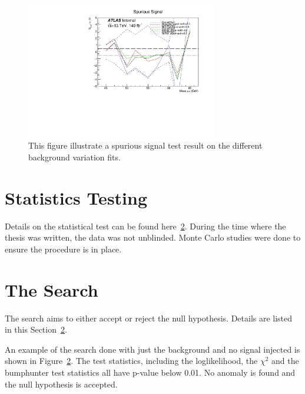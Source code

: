 \begin{figure}[!htb]
    \begin{center}
        \includegraphics[width=0.75\textwidth]{figures/chapter_dimuon/spurious}        
        \caption{
        This figure illustrate a spurious signal test result on the different background variation fits.}
            \label{fig:dimuonstudies}
    \end{center}
\end{figure}

\section{Statistics Testing}
Details on the statistical test can be found here~\ref{}. During the time where the thesis was written, the data was not unblinded. Monte Carlo studies were done to ensure the procedure is in place. 

\section{The Search}
The search aims to either accept or reject the null hypothesis. Details are listed in this Section~\ref{}.

An example of the search done with just the background and no signal injected is shown in Figure~\ref{}. The test statistics, including 
the loglikelihood, the $\chi^{2}$ and the bumphunter test statistics all have p-value below 0.01. No anomaly is found and the null hypothesis is accepted.
    
